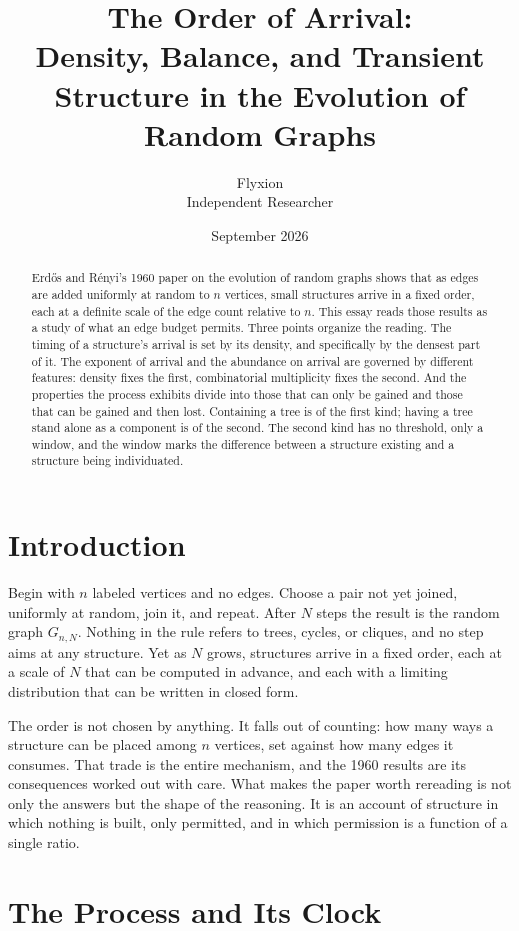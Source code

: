 \documentclass[11pt]{article}
\title{The Order of Arrival:\\[4pt]
\large Density, Balance, and Transient Structure in the Evolution of Random Graphs}
\author{Flyxion\\ \small Independent Researcher}
\date{September 2026}
\begin{document}
\maketitle

\begin{abstract}
Erd\H{o}s and R\'enyi's 1960 paper on the evolution of random graphs shows that as edges are added uniformly at random to $n$ vertices, small structures arrive in a fixed order, each at a definite scale of the edge count relative to $n$. This essay reads those results as a study of what an edge budget permits. Three points organize the reading. The timing of a structure's arrival is set by its density, and specifically by the densest part of it. The exponent of arrival and the abundance on arrival are governed by different features: density fixes the first, combinatorial multiplicity fixes the second. And the properties the process exhibits divide into those that can only be gained and those that can be gained and then lost. Containing a tree is of the first kind; having a tree stand alone as a component is of the second. The second kind has no threshold, only a window, and the window marks the difference between a structure existing and a structure being individuated.
\end{abstract}

\section{Introduction}

Begin with $n$ labeled vertices and no edges. Choose a pair not yet joined, uniformly at random, join it, and repeat. After $N$ steps the result is the random graph $G_{n,N}$. Nothing in the rule refers to trees, cycles, or cliques, and no step aims at any structure. Yet as $N$ grows, structures arrive in a fixed order, each at a scale of $N$ that can be computed in advance, and each with a limiting distribution that can be written in closed form.

The order is not chosen by anything. It falls out of counting: how many ways a structure can be placed among $n$ vertices, set against how many edges it consumes. That trade is the entire mechanism, and the 1960 results are its consequences worked out with care. What makes the paper worth rereading is not only the answers but the shape of the reasoning. It is an account of structure in which nothing is built, only permitted, and in which permission is a function of a single ratio.

\section{The Process and Its Clock}
\end{document}
